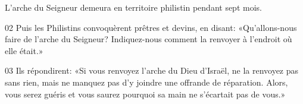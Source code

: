 L’arche du Seigneur demeura en territoire philistin pendant sept mois.

02 Puis les Philistins convoquèrent prêtres et devins, en disant: «Qu’allons-nous faire de l’arche du Seigneur? Indiquez-nous comment la renvoyer à l’endroit où elle était.»

03 Ils répondirent: «Si vous renvoyez l’arche du Dieu d’Israël, ne la renvoyez pas sans rien, mais ne manquez pas d’y joindre une offrande de réparation. Alors, vous serez guéris et vous saurez pourquoi sa main ne s’écartait pas de vous.»